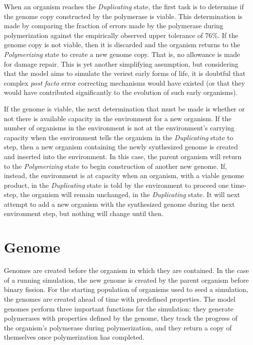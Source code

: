 When an organism reaches the \emph{Duplicating} state, the first task is to determine if the genome copy constructed by the polymerase is viable. This determination is made by comparing the fraction of errors made by the polymerase during polymerization against the empirically observed upper tolerance of 76\%. If the genome copy is not viable, then it is discarded and the organism returns to the \emph{Polymerizing} state to create a new genome copy. That is, no allowance is made for damage repair. This is yet another simplifying assumption, but considering that the model aims to simulate the veriest early forms of life, it is doubtful that complex \emph{post facto} error correcting mechanisms would have existed (or that they would have contributed significantly to the evolution of such early organisms).

If the genome is viable, the next determination that must be made is whether or not there is available capacity in the environment for a new organism. If the number of organisms in the environment is not at the environment's carrying capacity when the environment tells the organism in the \emph{Duplicating} state to step, then a new organism containing the newly synthesized genome is created and inserted into the environment. In this case, the parent organism will return to the \emph{Polymerizing} state to begin construction of another new genome. If, instead, the environment is at capacity when an organism, with a viable genome product, in the \emph{Duplicating} state is told by the environment to proceed one time-step, the organism will remain unchanged, in the \emph{Duplicating} state. It will next attempt to add a new organism with the synthesized genome during the next environment step, but nothing will change until then.

\section*{Genome} %
\label{sec:genome}
Genomes are created before the organism in which they are contained. In the case of a running simulation, the new genome is created by the parent organism before binary fission. For the starting population of organisms used to seed a simulation, the genomes are created ahead of time with predefined properties. The model genomes perform three important functions for the simulation: they generate polymerases with properties defined by the genome, they track the progress of the organism's polymerase during polymerization, and they return a copy of themselves once polymerization has completed.

